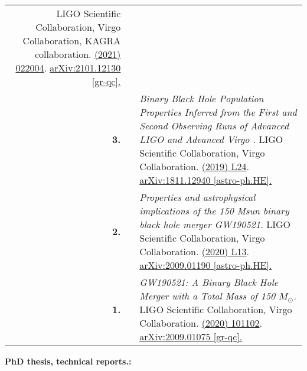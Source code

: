 {\begin{longtable}{rp{0.3cm}p{15.8cm}}
\newline{}
LIGO Scientific Collaboration, Virgo Collaboration, KAGRA collaboration.
\newline{}
\href{https://journals.aps.org/prd/abstract/10.1103/PhysRevD.104.022004}{\prd 104 (2021) 022004}. \href{https://arxiv.org/abs/2101.12130}{arXiv:2101.12130 [gr-qc].}
\vspace{0.09cm}\\
%
\textbf{3.} & & \textit{Binary Black Hole Population Properties Inferred from the First and Second Observing Runs of Advanced LIGO and Advanced Virgo .}
\newline{}
LIGO Scientific Collaboration, Virgo Collaboration.
\newline{}
\href{https://iopscience.iop.org/article/10.3847/2041-8213/ab3800}{\apj 882 (2019)  L24}. \href{https://arxiv.org/abs/1811.12940}{arXiv:1811.12940 [astro-ph.HE].}
\vspace{0.09cm}\\
%
\textbf{2.} & & \textit{Properties and astrophysical implications of the 150 Msun binary black hole merger GW190521.}
\newline{}
LIGO Scientific Collaboration, Virgo Collaboration.
\newline{}
\href{https://iopscience.iop.org/article/10.3847/2041-8213/aba493}{\apjl 900 (2020) L13}. \href{https://arxiv.org/abs/2009.01190}{arXiv:2009.01190 [astro-ph.HE].}
\vspace{0.09cm}\\
%
\textbf{1.} & & \textit{GW190521: A Binary Black Hole Merger with a Total Mass of 150 $M_\odot$.}
\newline{}
LIGO Scientific Collaboration, Virgo Collaboration.
\newline{}
\href{https://journals.aps.org/prl/abstract/10.1103/PhysRevLett.125.101102}{\prl 125 (2020) 101102}. \href{https://arxiv.org/abs/2009.01075}{arXiv:2009.01075 [gr-qc].}
\vspace{0.09cm}\\
%
\end{longtable} }
\textcolor{color1}{\textbf{PhD thesis, technical reports.:}}
\vspace{-0.5cm}

